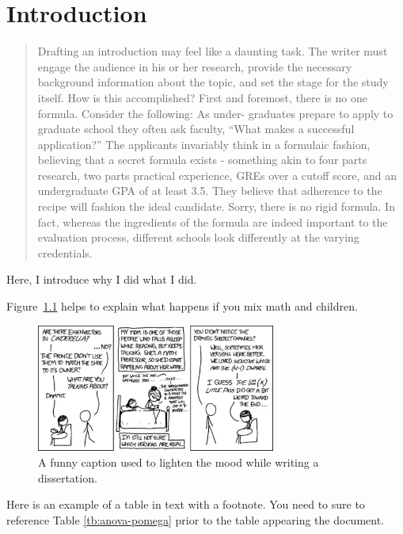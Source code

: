 \chapter{Introduction}


\begin{quote}
Drafting an introduction may feel like a daunting task. The writer must engage the audience in his or her research, provide the necessary background information about the topic, and set the stage for the study itself. How is this accomplished? First and foremost, there is no one formula. Consider the following: As under- graduates prepare to apply to graduate school they often ask faculty, ``What makes a successful application?'' The applicants invariably think in a formulaic fashion, believing that a secret formula exists - something akin to four parts research, two parts practical experience, GREs over a cutoff score, and an undergraduate GPA of at least 3.5. They believe that adherence to the recipe will fashion the ideal candidate. Sorry, there is no rigid formula. In fact, whereas the ingredients of the formula are indeed important to the evaluation process, different schools look differently at the varying credentials. \citep[][p. 41]{'4632'}
\end{quote}

Here, I introduce why I did what I did.
  
Figure~\ref{fig:Funnyhaha} helps to explain what happens if you mix math and children.

\begin{figure}[h!]
\centering
\includegraphics[width=0.7\textwidth]{figure/fairy_tales.pdf}
\caption{A funny caption used to lighten the mood while writing a dissertation.} \label{fig:Funnyhaha}
\end{figure}

Here is an example of a table in text with a footnote. You need to sure to reference Table \ref{tb:anova-pomega} prior to the table appearing the document. 


